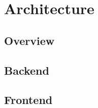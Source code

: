 \chapter{Architecture}
\label{ch:Architecture}

\section{Overview}

\section{Backend}

\section{Frontend}
